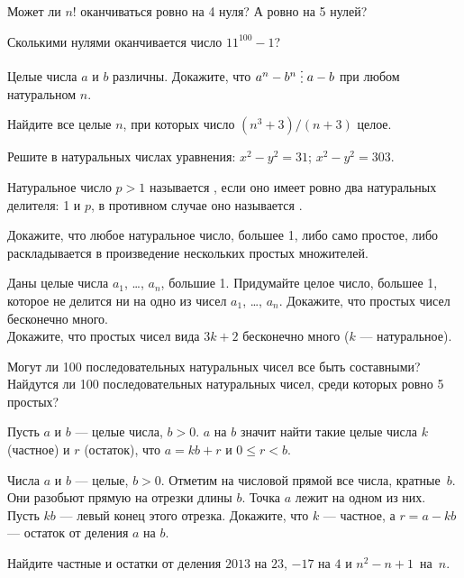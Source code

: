 \documentclass[a4paper,12pt]{article}
\newcommand{\del}{\mathrel{\raisebox{-.3 ex}{${\vdots}$}}}
\begin{document}
Может ли $n!$ оканчиваться ровно на 4 нуля? А ровно на 5 нулей?

Сколькими нулями оканчивается число $11^{100}-1$?

Целые числа $a$ и $b$ различны. Докажите, что $a^n-b^n\del a-b$
при любом натуральном $n$.

Найдите все целые $n$, при которых число $(n^3+3)/(n+3)$ целое.

Решите в натуральных числах уравнения:
$x^2-y^2=31$;
$x^2-y^2=303$.


Натуральное число $p>1$ называется , если оно имеет ровно два
натуральных делителя: 1 и $p$, в противном случае оно
называется .

 Докажите, что любое натуральное число, большее 1,
либо само простое, либо раскладывается в произведение нескольких
простых множителей.


Даны целые числа $a_1$, \ldots, $a_n$, большие 1.
Придумайте целое число, большее 1, которое не делится ни на одно из чисел
$a_1$, \ldots, $a_n$.
 Докажите, что простых чисел бесконечно много.\\
 Докажите, что простых чисел вида $3k+2$ бесконечно много
($k$ --- натуральное).

Могут ли 100 последовательных натуральных чисел
все быть составными?\\
Найдутся ли 100 последовательных натуральных чисел,
среди которых ровно 5 простых?

Пусть $a$ и $b$ --- целые числа, $b>0$.
 $a$ на $b$  значит найти
такие целые числа $k$ (частное) и $r$ (остаток),
что $a = kb + r$ и $0\leq r < b$.


Числа $a$ и $b$ --- целые, $b>0$.
Отметим на числовой прямой все числа, кратные~$b$.
Они разобьют прямую на отрезки длины $b$.
Точка $a$ лежит на одном из них.
Пусть $kb$ --- левый конец этого отрезка.
Докажите, что $k$ --- частное, а
$r = a - kb$ --- остаток от деления $a$ на $b$.


Найдите частные и остатки от деления $2013$ на $23$, $-17$ на $4$ и
$n^2-n+1$~на~$n$.
\end{document}
